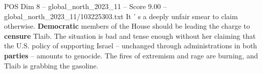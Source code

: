 \begin{textsample}{POS Dim 8 – global\_north\_2023\_11 – Score 9.00 – global\_north\_2023\_11/103225303.txt}
It ' s a deeply unfair smear to claim otherwise. \textbf{Democratic} members of the House should be leading the charge to \textbf{censure} Tlaib.
The situation is bad and tense enough without her claiming that the U.S. policy of supporting Israel -- unchanged through administrations in both \textbf{parties} -- amounts to genocide.
The fires of extremism and rage are burning, and Tlaib is grabbing the gasoline.

\end{textsample}
